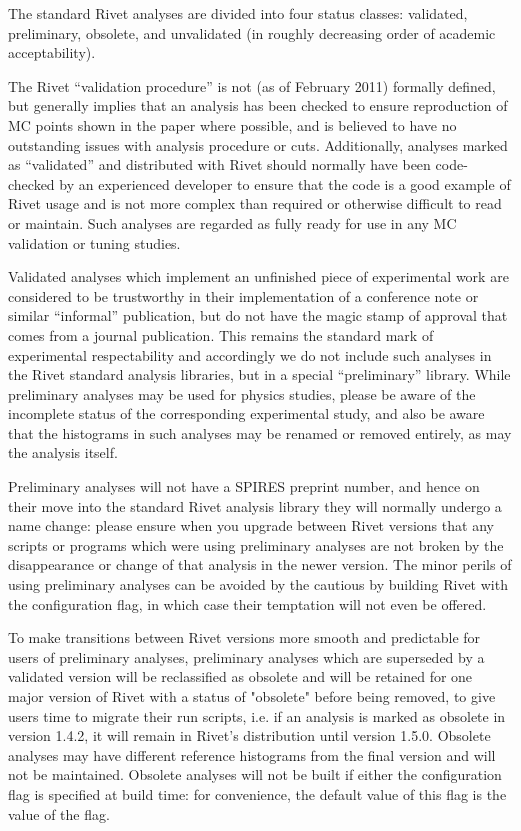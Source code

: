 The standard Rivet analyses are divided into four status classes: validated,
preliminary, obsolete, and unvalidated (in roughly decreasing order of academic
acceptability).

The Rivet ``validation procedure'' is not (as of February 2011) formally
defined, but generally implies that an analysis has been checked to ensure
reproduction of MC points shown in the paper where possible, and is believed to
have no outstanding issues with analysis procedure or cuts.  Additionally,
analyses marked as ``validated'' and distributed with Rivet should normally have
been code-checked by an experienced developer to ensure that the code is a good
example of Rivet usage and is not more complex than required or otherwise
difficult to read or maintain. Such analyses are regarded as fully ready for use
in any MC validation or tuning studies.

Validated analyses which implement an unfinished piece of experimental work are
considered to be trustworthy in their implementation of a conference note or
similar ``informal'' publication, but do not have the magic stamp of approval
that comes from a journal publication. This remains the standard mark of
experimental respectability and accordingly we do not include such analyses in
the Rivet standard analysis libraries, but in a special ``preliminary''
library. While preliminary analyses may be used for physics studies, please be
aware of the incomplete status of the corresponding experimental study, and also
be aware that the histograms in such analyses may be renamed or removed
entirely, as may the analysis itself.

Preliminary analyses will not have a SPIRES preprint number, and hence on their
move into the standard Rivet analysis library they will normally undergo a name
change: please ensure when you upgrade between Rivet versions that any scripts
or programs which were using preliminary analyses are not broken by the
disappearance or change of that analysis in the newer version. The minor perils
of using preliminary analyses can be avoided by the cautious by building Rivet
with the  configuration flag, in which case their
temptation will not even be offered.

To make transitions between Rivet versions more smooth and predictable for users
of preliminary analyses, preliminary analyses which are superseded by a
validated version will be reclassified as obsolete and will be retained for one
major version of Rivet with a status of "obsolete" before being removed, to give
users time to migrate their run scripts, i.e. if an analysis is marked as
obsolete in version 1.4.2, it will remain in Rivet's distribution until version
1.5.0.  Obsolete analyses may have different reference histograms from the final
version and will not be maintained. Obsolete analyses will not be built if
either the  configuration flag is specified at build
time: for convenience, the default value of this flag is the value of the
 flag.

